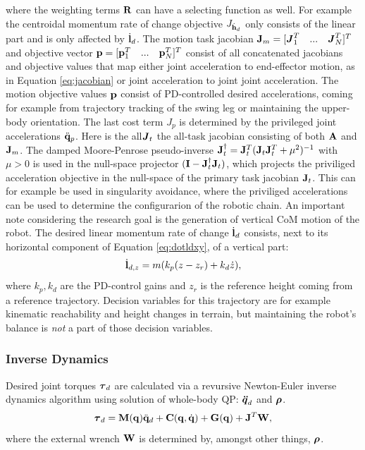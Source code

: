 where the weighting terms $\mathbf{R}$ can have a selecting function as well. For example the centroidal momentum rate of change objective $J_{\dot{\mathbf{h}}_d}$ only consists of the linear part and is only affected by $\dot{\mathbf{l}}_d$. The motion task jacobian $\mathbf{J}_m = [\boldsymbol{J}_1^T\quad...\quad\boldsymbol{J}_N^T]^T$ and objective vector $\mathbf{p} = [\mathbf{p}_1^T\quad...\quad\mathbf{p}_N^T]^T$ consist of all concatenated jacobians and objective values that map either joint acceleration to end-effector motion, as in Equation \eqref{eq:jacobian} or joint acceleration to joint joint acceleration. The motion objective values $\mathbf{p}$ consist of PD-controlled desired accelerations, coming for example from trajectory tracking of the swing leg or maintaining the upper-body orientation. The last cost term $J_p$ is determined by the privileged joint accelerations $\ddot{\mathbf{q}}_p$. Here is the all$\boldsymbol{J}_t$ the all-task jacobian consisting of both $\mathbf{A}$ and $\mathbf{J}_m$. The damped Moore-Penrose pseudo-inverse  $\mathbf{J}_t^{\dagger} = \mathbf{J}_t^T(\mathbf{J}_t\mathbf{J}_t^T +\mu^2)^{-1}$ with $\mu>0$ is used in the null-space projector $(\mathbf{I} - \mathbf{J}_t^{\dagger}\mathbf{J}_t)$, which projects the priviliged acceleration objective in the null-space of the primary task jacobian $\mathbf{J}_t$. This can for example be used in singularity avoidance, where the priviliged accelerations can be used to determine the configurarion of the robotic chain.  
\paraskip
An important note considering the research goal is the generation of vertical \ac{CoM} motion of the robot. The desired linear momentum rate of change $\dot{\mathbf{l}}_d$ consists, next to its horizontal component of Equation \eqref{eq:dotldxy}, of a vertical part:
\begin{equation}
\dot{\mathbf{l}}_{d,z} =m(k_p(z-z_r) + k_d\dot{z}), 
\end{equation}
where $k_p, k_d$ are the PD-control gains and $z_r$ is the reference height coming from a reference trajectory. Decision variables for this trajectory are for example kinematic reachability and height changes in terrain, but maintaining the robot's balance is \textit{not } a part of those decision variables.


\subsubsection{Inverse Dynamics}
Desired joint torques $\boldsymbol{\tau}_d$ are calculated via a revursive Newton-Euler inverse dynamics algorithm using solution of whole-body \ac{QP}: $\boldsymbol{\ddot{q}}_d$ and $\boldsymbol{\rho}$.
\begin{equation}
    \boldsymbol{\tau}_d = \mathbf{M}(\mathbf{q})\ddot{\mathbf{q}}_d + \mathbf{C}(\mathbf{q},\dot{\mathbf{q}}) + \mathbf{G}(\mathbf{q}) + \mathbf{J}^T \mathbf{W},
\end{equation}
where the external wrench $\mathbf{W}$ is determined by, amongst other things, $\boldsymbol{\rho}$.

